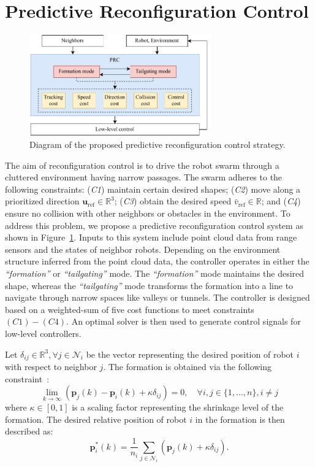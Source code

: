 \section{Predictive Reconfiguration Control}\label{sec:propose}

\begin{figure}
    \centering
    \includegraphics[width=0.7\textwidth]{paper3/images/diagram.pdf}
    \caption{Diagram of the proposed predictive reconfiguration control strategy.}
    \label{fig:diagram}
\end{figure}

The aim of reconfiguration control is to drive the robot swarm through a cluttered environment having narrow passages. The swarm adheres to the following constraints: (\textit{C1}) maintain certain desired shapes; (\textit{C2}) move along a prioritized direction $\mathbf{u}_\text{ref}\in\mathbb{R}^{3}$; (\textit{C3}) obtain the desired speed $\bar{v}_\text{ref}\in\mathbb{R}$; and (\textit{C4}) ensure no collision with other neighbors or obstacles in the environment. To address this problem, we propose a predictive reconfiguration control system as shown in Figure~\ref{fig:diagram}. Inputs to this system include point cloud data from range sensors and the states of neighbor robots. Depending on the environment structure inferred from the point cloud data, the controller operates in either the \textit{``formation''} or \textit{``tailgating''} mode. The \textit{``formation''} mode maintains the desired shape, whereas the \textit{``tailgating''} mode transforms the formation into a line to navigate through narrow spaces like valleys or tunnels. The controller is designed based on a weighted-sum of five cost functions to meet constraints $(C1)-(C4)$. An optimal solver is then used to generate control signals for low-level controllers.

Let $\delta_{ij}\in\mathbb{R}^3,\forall j\in \mathcal{N}_i$ be the vector representing the desired position of robot $i$ with respect to neighbor $j$. The formation is obtained via the following constraint~\cite{Dong2016,6798711}:
\begin{equation}
    \lim_{k\to\infty}{\left(\mathbf{p}_j(k)-\mathbf{p}_i(k)+\kappa\delta_{ij}\right)}=0,\quad\forall i,j\in\{1,...,n\}, i\neq j
\end{equation}
where $\kappa\in[0,1]$ is a scaling factor representing the shrinkage level of the formation. The desired relative position of robot $i$ in the formation is then described as:
\begin{equation}
    \mathbf{p}^*_i(k)=\dfrac{1}{n_i}\sum_{j\in\mathcal{N}_i}{\left(\mathbf{p}_j\left(k\right)+\kappa\delta_{ij}\right)}.
    \label{eqn:formation}
\end{equation}


